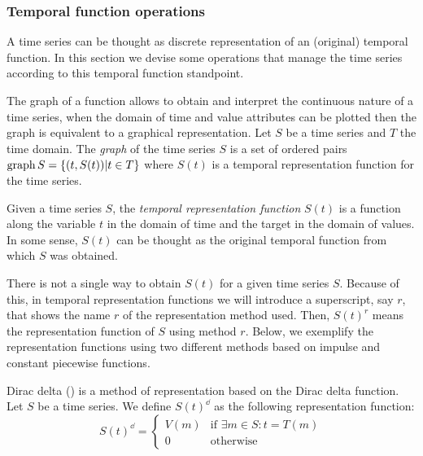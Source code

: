 \subsubsection{Temporal function operations}
\label{sec:model:tfunc}

A time series can be thought as discrete representation of an
(original) temporal function. In this section we devise some
operations that manage the time series according to this temporal
function standpoint.  
%

The graph of a function allows to obtain and interpret the
continuous nature of a time series, when the domain of time and value
attributes can be plotted then the graph is equivalent to a graphical
representation.  
%
Let $S$ be a time series and $T$ the time domain. The \emph{graph} of
the time series $S$ is a set of ordered pairs $\operatorname*{graph} S
=\{(t,S(t))|t\in T\}$ where $S(t)$ is a temporal representation
function for the time series.
%

Given a time series $S$, the \emph{temporal representation function}
$S(t)$ is a function along the variable $t$ in the domain of
time and the target in the domain of values.
%
In some sense, $S(t)$ can be thought as the original temporal function
from which $S$ was obtained.
%

There is not a single way to obtain $S(t)$ for a given time series
$S$. Because of this, in temporal representation functions we will
introduce a superscript, say $r$, that shows the name $r$ of the
representation method used. Then, $S(t)^r$ means the representation
function of $S$ using method $r$. Below, we exemplify the
representation functions using two different methods based on impulse
and constant piecewise functions.


\begin{definition} 
  Dirac delta (\dd) is a method of representation based on the Dirac
  delta function. Let $S$ be a time series. We define $S(t)^\dd$ as
  the following \dd{} representation function:
  \[
  S(t)^\dd
  =  \begin{cases}
          V(m) & \text{if } \exists m\in S:t=T(m) \\
          0    & \text{otherwise}
  \end{cases}
  \]
\end{definition}

